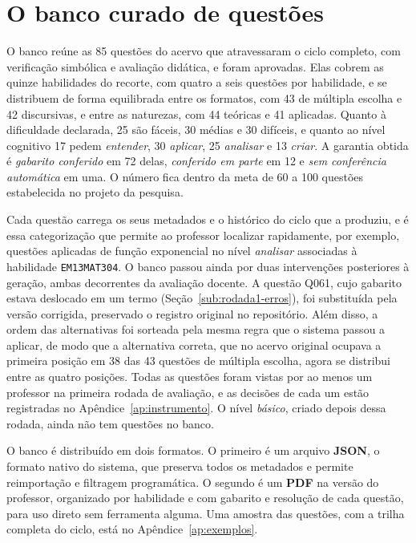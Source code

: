\section{O banco curado de questões}
\label{sec:produto-banco}

O banco reúne as 85 questões do acervo que atravessaram o ciclo completo, com verificação simbólica e
avaliação didática, e foram aprovadas. Elas cobrem as quinze habilidades do recorte, com quatro a
seis questões por habilidade, e se distribuem de forma equilibrada entre os formatos, com 43 de
múltipla escolha e 42 discursivas, e entre as naturezas, com 44 teóricas e 41 aplicadas. Quanto à
dificuldade declarada, 25 são fáceis, 30 médias e 30 difíceis, e quanto ao nível cognitivo 17
pedem \emph{entender}, 30 \emph{aplicar}, 25 \emph{analisar} e 13 \emph{criar}. A garantia obtida é
\emph{gabarito conferido} em 72 delas, \emph{conferido em parte} em 12 e \emph{sem conferência
automática} em uma. O número fica dentro da meta de 60 a 100 questões estabelecida no projeto da
pesquisa.

Cada questão carrega os seus metadados e o histórico do ciclo que a produziu, e é essa categorização
que permite ao professor localizar rapidamente, por exemplo, questões aplicadas de função exponencial
no nível \emph{analisar} associadas à habilidade \texttt{EM13MAT304}. O banco passou ainda por duas
intervenções posteriores à geração, ambas decorrentes da avaliação docente. A questão Q061, cujo
gabarito estava deslocado em um termo (Seção~\ref{sub:rodada1-erros}), foi substituída pela versão
corrigida, preservado o registro original no repositório. Além disso, a ordem das alternativas foi
sorteada pela mesma regra que o sistema passou a aplicar, de modo que a alternativa correta, que no
acervo original ocupava a primeira posição em 38 das 43 questões de múltipla escolha, agora se
distribui entre as quatro posições. Todas as questões foram vistas por ao menos um professor na
primeira rodada de avaliação, e as decisões de cada um estão registradas no
Apêndice~\ref{ap:instrumento}. O nível \emph{básico}, criado depois dessa rodada, ainda não tem
questões no banco.

O banco é distribuído em dois formatos. O primeiro é um arquivo \textbf{JSON}, o formato nativo do
sistema, que preserva todos os metadados e permite reimportação e filtragem programática. O segundo é
um \textbf{PDF} na versão do professor, organizado por habilidade e com gabarito e resolução de cada
questão, para uso direto sem ferramenta alguma. Uma amostra das questões, com a trilha completa do
ciclo, está no Apêndice~\ref{ap:exemplos}.

